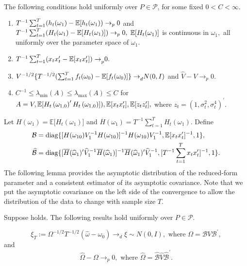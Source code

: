 \documentclass[11pt, letterpaper, twoside]{article}
\begin{document}
\begin{assumpR}
    \label{assump:R}
    The following conditions hold uniformly over $P\in \mathcal{P}$, for some fixed $0 < C < \infty$.
    
    \begin{enumerate}
        \item $T^{-1}\sum_{t=1}^{T}(h_{t}(\omega_{1})-\operatorname{\mathbb{E}}[ h_{t}(\omega _{1}))\rightarrow _{p}0$ and $T^{-1}\sum_{t=1}^{T}(H_{t}(\omega _{1})-\operatorname{\mathbb{E}}[H_{t}(\omega _{1})])\rightarrow _{p}0,$ $\operatorname{\mathbb{E}}[H_{t}(\omega _{1})]$ is continuous in $\omega _{1},$ all uniformly over the parameter space of $\omega _{1}$.
        \item $T^{-1}\sum_{t=1}^{T}(x_{t}x_{t}^{\prime }-\operatorname{\mathbb{E}}[ x_{t}x_{t}^{\prime }{])\rightarrow }_{p}0.$
        \item $V^{-1/2}\{T^{-1/2}(\sum_{t=1}^{T}f_{t}(\omega _{0})-\operatorname{\mathbb{E}}[f_{t}(\omega _{0}){]\} \rightarrow }_{d}N(0,I)$ and $\widehat{V} -V\rightarrow _{p}0.$
        \item $C^{-1}\leq \lambda_{\min }(A)\leq \lambda_{\max }(A)\leq C$ for $A=V,\operatorname{\mathbb{E}}[H_{t}\left( \omega _{1,0}\right) ^{\prime }H_{t}\left( \omega _{1,0}\right) ]),\operatorname{\mathbb{E}}[x_{t}x_{t}^{\prime }],\operatorname{\mathbb{E}}[ z_{t}z_{t}^{\prime }],$ where $z_{t}=(1,\sigma _{t}^{2},\sigma _{t}^{4})^{\prime }.$
    \end{enumerate}
\end{assumpR}


Let $H(\omega _{1})=\mathbb{E[}H_{t}(\omega _{1})]$ and $\overline{H}(\omega _{1})=T^{-1}\sum_{t=1}^{T}H_{t}(\omega _{1}).$ Define
%
\begin{align}
%
    \mathcal{B} &= \diag\{[H(\omega _{10})V_{1}^{-1}H(\omega _{10})]^{-1}H(\omega _{10})V_{1}^{-1},\mathbb{E[}x_{t}x_{t}^{\prime }]^{-1},1\},  \notag \\
%
    \widehat{\mathcal{B}} &= \diag\{[\overline{H}(\widehat{\omega }_{1})^{\prime } \widehat{V}_{1}^{-1}\overline{H}(\widehat{\omega }_{1})]^{-1}\overline{H}( \widehat{\omega }_{1})^{\prime }\widehat{V}_{1}^{-1},[T^{-1}
\sum_{t=1}^{T}x_{t}x_{t}^{\prime }]^{-1},1\}.  
%
    \label{Fhat}
\end{align}
%
The following lemma provides the asymptotic distribution of the reduced-form parameter and a consistent estimator of its asymptotic covariance. Note that we put the asymptotic covariance on the left side of the convergence to allow the distribution of the data to change with sample size $T$.

\begin{lemma}
\label{Lemma Reduce}
Suppose  holds. The following results hold uniformly over $P\in \mathcal{P}$.

    \begin{equation*} 
        \xi _{T}:=\Omega ^{-1/2}T^{-1/2}(\widehat{\omega } -\omega _{0})\rightarrow _{d}\xi \sim N(0,I), \text{  where } \Omega =\mathcal{B}V \mathcal{B}^{\prime }, 
    \end{equation*} 
%
    and 
%
    \begin{equation*}
        \widehat{\Omega }-\Omega \rightarrow_{p}0, \text{ where } \widehat{\Omega }=\widehat{\mathcal{B}}\widehat{V}\widehat{\mathcal{B}}^{\prime}.
    \end{equation*}
\end{lemma}
\end{document}
